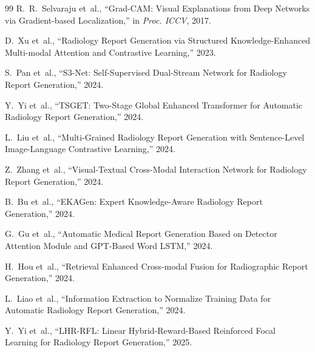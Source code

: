 \documentclass[12pt,a4paper]{report}
\begin{document}
\begin{thebibliography}{99}
R.~R.~Selvaraju et~al., ``Grad-CAM: Visual Explanations from Deep Networks via Gradient-based Localization,'' in \emph{Proc. ICCV}, 2017.

D.~Xu et~al., ``Radiology Report Generation via Structured Knowledge-Enhanced Multi-modal Attention and Contrastive Learning,'' 2023.

S.~Pan et~al., ``S3-Net: Self-Supervised Dual-Stream Network for Radiology Report Generation,'' 2024.

Y.~Yi et~al., ``TSGET: Two-Stage Global Enhanced Transformer for Automatic Radiology Report Generation,'' 2024.

L.~Liu et~al., ``Multi-Grained Radiology Report Generation with Sentence-Level Image-Language Contrastive Learning,'' 2024.

Z.~Zhang et~al., ``Visual-Textual Cross-Modal Interaction Network for Radiology Report Generation,'' 2024.

B.~Bu et~al., ``EKAGen: Expert Knowledge-Aware Radiology Report Generation,'' 2024.

G.~Gu et~al., ``Automatic Medical Report Generation Based on Detector Attention Module and GPT-Based Word LSTM,'' 2024.

H.~Hou et~al., ``Retrieval Enhanced Cross-modal Fusion for Radiographic Report Generation,'' 2024.

L.~Liao et~al., ``Information Extraction to Normalize Training Data for Automatic Radiology Report Generation,'' 2024.

Y.~Yi et~al., ``LHR-RFL: Linear Hybrid-Reward-Based Reinforced Focal Learning for Radiology Report Generation,'' 2025.

\end{thebibliography}
\end{document}
